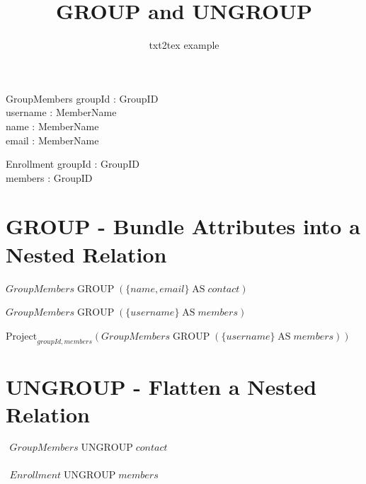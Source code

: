 \documentclass[a4paper,10pt,fleqn]{article}
\title{GROUP and UNGROUP}
\author{txt2tex example}
\begin{document}
\maketitle

\begin{zed}\end{zed}

\begin{schema}{GroupMembers}
groupId : GroupID \\
username : MemberName \\
name : MemberName \\
email : MemberName
\end{schema}

\begin{schema}{Enrollment}
groupId : GroupID \\
members : \power GroupID
\end{schema}

\section*{GROUP - Bundle Attributes into a Nested Relation}

\noindent
$GroupMembers \mathop{\mathrm{GROUP}} (\{name, email\} \mathop{\mathrm{AS}} contact)$


\noindent
$GroupMembers \mathop{\mathrm{GROUP}} (\{username\} \mathop{\mathrm{AS}} members)$


\noindent
$\mathrm{Project}_{groupId, members}(GroupMembers \mathop{\mathrm{GROUP}} (\{username\} \mathop{\mathrm{AS}} members))$


\section*{UNGROUP - Flatten a Nested Relation}

\noindent
$\displaystyle
\begin{array}{l}
GroupMembers \mathop{\mathrm{UNGROUP}} contact \\
\quad 
\end{array}$

\bigskip

\noindent
$\displaystyle
\begin{array}{l}
Enrollment \mathop{\mathrm{UNGROUP}} members \\
\quad 
\end{array}$
\end{document}
